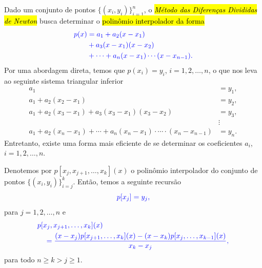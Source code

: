 Dado um conjunto de pontos $\{(x_i, y_i)\}_{i=1}^n$, o \hl{\emph{Método das Diferenças Divididas de Newton}}{\newton} busca determinar o \hl{polinômio interpolador da forma}
\begin{equation}\color{blue}\begin{aligned}
    p(x) &= a_1 + a_2(x-x_1) \\
    &+ a_3(x-x_1)(x-x_2)\\
    &+ \cdots + a_{n}(x-x_1) \cdots (x-x_{n-1}).
  \end{aligned}
\end{equation}
Por uma abordagem direta, temos que $p(x_i)=y_i$, $i=1, 2, \dotsc, n$, o que nos leva ao seguinte sistema triangular inferior
\begin{subequations}
  \begin{align}
    a_1 &= y_1, \\
    a_1 + a_2(x_2-x_1) &= y_2, \\
    a_1 + a_2(x_3-x_1) + a_3(x_3-x_1)(x_3-x_2) &= y_3, \\
        &\vdots\\
    a_1 + a_2(x_n-x_1) + \cdots + a_{n}(x_n-x_1)\cdot\cdots\cdot(x_n-x_{n-1}) &= y_n.
  \end{align}
\end{subequations}
Entretanto, existe uma forma mais eficiente de se determinar os coeficientes $a_i$, $i=1, 2, \dotsc, n$.

Denotemos por $p[x_j, x_{j+1}, \dotsc, x_{k}](x)$ o polinômio interpolador do conjunto de pontos $\{(x_i, y_i)\}_{i=j}^k$. Então, temos a seguinte recursão
\begin{equation}\label{cap_interp_sec_difdiv:eq:interp_parc1}\color{blue}p[x_j] = y_j,
\end{equation}
para $j=1, 2, \dotsc, n$ e
\begin{equation}\label{cap_interp_sec_difdiv:eq:interp_parc2}\color{blue}\begin{aligned}
    &p[x_j, x_{j+1}, \ldots, x_k](x)\\
    &\quad = \frac{(x-x_j)p[x_{j+1},\dotsc,x_k](x)-(x-x_k)p[x_j,\dotsc,x_{k-1}](x)}{x_k-x_j},
  \end{aligned}
\end{equation}
para todo $n\geq k > j \geq 1$.

